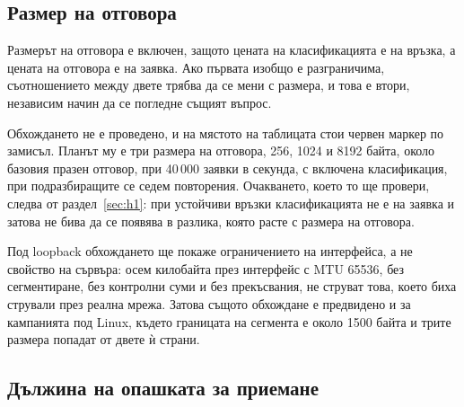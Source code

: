 \subsection{Размер на отговора}
\label{sec:payload}


Размерът на отговора е включен, защото цената на класификацията е на връзка, а цената на
отговора е на заявка. Ако първата изобщо е разграничима, съотношението между двете трябва да
се мени с размера, и това е втори, независим начин да се погледне същият въпрос.

Обхождането не е проведено, и на мястото на таблицата стои червен маркер по замисъл. Планът
му е три размера на отговора, 256, 1024 и 8192 байта, около базовия празен отговор, при
40\,000 заявки в секунда, с включена класификация, при подразбиращите се седем повторения.
Очакването, което то ще провери, следва от раздел~\ref{sec:h1}: при устойчиви връзки
класификацията не е на заявка и затова не бива да се появява в разлика, която расте с
размера на отговора.

Под loopback обхождането ще покаже ограничението на интерфейса, а не свойство на сървъра:
осем килобайта през интерфейс с MTU 65536, без сегментиране, без контролни суми и без
прекъсвания, не струват това, което биха стрували през реална мрежа. Затова същото
обхождане е предвидено и за кампанията под Linux, където границата на сегмента е около
1500 байта и трите размера попадат от двете ѝ страни.

\subsection{Дължина на опашката за приемане}
\label{sec:backlog}

